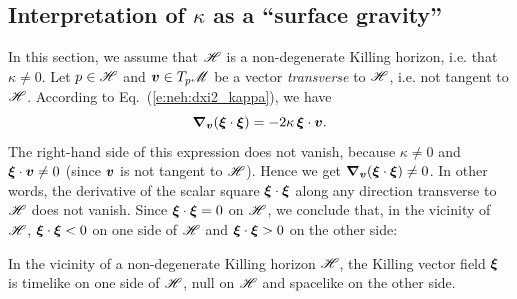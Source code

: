 \subsection{Interpretation of \texorpdfstring{$\kappa$}{κ} as a ``surface gravity''}
\label{s:neh:surface_gravity}

In this section, we assume that $\mathscr{H}$ is a non-degenerate Killing horizon,
i.e. that $\kappa\not=0$.
Let $p\in\mathscr{H}$ and $\bm{v}\in T_p\mathscr{M}$ be a vector \emph{transverse} to $\mathscr{H}$, i.e.
not tangent to $\mathscr{H}$. According to Eq.~(\ref{e:neh:dxi2_kappa}), we have
\[
    \bm{\nabla}_{\bm{v}} (\bm{\xi}\cdot\bm{\xi}) = - 2\kappa \, \bm{\xi}\cdot\bm{v} .
\]
The right-hand side of this expression does not vanish, because
$\kappa\not=0$ and $\bm{\xi}\cdot\bm{v} \not=0$ (since $\bm{v}$ is not
tangent to $\mathscr{H}$). Hence we get
$\bm{\nabla}_{\bm{v}} (\bm{\xi}\cdot\bm{\xi}) \not= 0$.
In other words, the derivative of the scalar square $\bm{\xi}\cdot\bm{\xi}$
along any direction transverse to $\mathscr{H}$ does not vanish. Since
$\bm{\xi}\cdot\bm{\xi}=0$ on $\mathscr{H}$, we conclude that, in the vicinity of $\mathscr{H}$,
$\bm{\xi}\cdot\bm{\xi}<0$ on one side of $\mathscr{H}$ and $\bm{\xi}\cdot\bm{\xi}>0$ on the
other side:
\begin{tprop}{}{}
In the vicinity of a non-degenerate Killing horizon $\mathscr{H}$, the Killing vector field $\bm{\xi}$ is timelike on one side of $\mathscr{H}$, null on $\mathscr{H}$
and spacelike on the other side.
\end{tprop}

